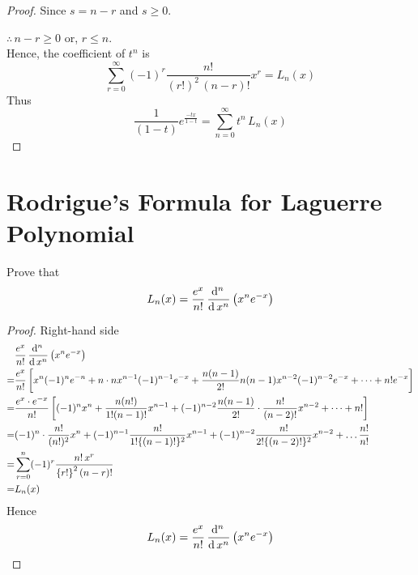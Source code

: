 \documentclass[../main-sheet.tex]{subfiles}
\begin{document}
\begin{proof}
    Since \( s=n-r \) and \( s\geq 0 \).

    \( \therefore\, n-r\geq 0 \) or, \( r\leq n \).\\

    Hence, the coefficient of \( t^n \) is 
    \[
        \sum_{r=0}^\infty(-1)^r\frac{n!}{(r!)^2\,(n-r)!}x^r=L_n(x)
    \]
    Thus 
    \[
        \frac{1}{(1-t)}e^{\frac{-tx}{1-t}}=\sum_{n=0}^\infty t^n\,L_n(x)
    \]
\end{proof}

\section{Rodrigue's Formula for Laguerre Polynomial}
\begin{prob}
    Prove that 
    \[
        L_n(x)=\frac{e^x}{n!}\,\frac{\mathrm{d}^{n}\, }{\mathrm{d}\, x^{n}}\left( x^ne^{-x} \right)
    \]
\end{prob}
\begin{proof}
    Right-hand side
    \begin{align*}
        &\frac{e^x}{n!}\,\frac{\mathrm{d}^{n}\, }{\mathrm{d}\, x^{n}}\left( x^ne^{-x} \right)\\
        =& \frac{e^x}{n!}\left[ x^n(-1)^ne^{-n}+n\cdot nx^{n-1}(-1)^{n-1}e^{-x}+\frac{n(n-1)}{2!}n(n-1)x^{n-2}(-1)^{n-2}e^{-x}+\dots+n!e^{-x} \right]\\
        =& \frac{e^x\cdot e^{-x}}{n!}\left[ (-1)^n x^{n}+\frac{n(n!)}{1!(n-1)!}x^{n-1}+(-1)^{n-2} \frac{n(n-1)}{2!}\cdot \frac{n!}{(n-2)!}x^{n-2}+\dots+n! \right]\\
        =& (-1)^n\cdot\frac{n!}{(n!)^2}x^n+(-1)^{n-1}\frac{n!}{1!\{(n-1)!\}^2}x^{n-1}+(-1)^{n-2}\frac{n!}{2!\{(n-2)!\}^2}x^{n-2}+\dots\frac{n!}{n!}\\
        =& \sum_{r=0}^n (-1)^r \frac{n!\,x^r}{\left\{ r!\right\}^2(n-r)!}\\
        =& L_n(x)
    \end{align*}
    Hence
    \[
        L_n(x)=\frac{e^x}{n!}\,\frac{\mathrm{d}^{n}\, }{\mathrm{d}\, x^{n}}\left( x^ne^{-x} \right)
    \]
\end{proof}
\end{document}
